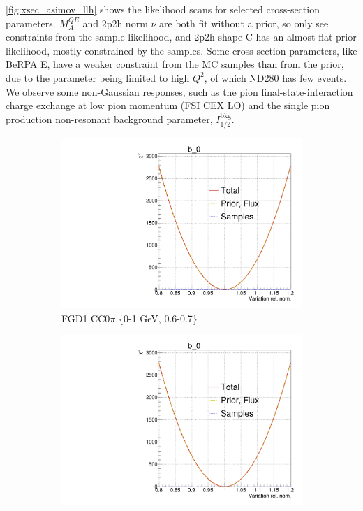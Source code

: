 \autoref{fig:xsec_asimov_llh} shows the likelihood scans for selected cross-section parameters. $M_A^{QE}$ and 2p2h norm $\nu$ are both fit without a prior, so only see constraints from the sample likelihood, and 2p2h shape C has an almost flat prior likelihood, mostly constrained by the samples. Some cross-section parameters, like BeRPA E, have a weaker constraint from the MC samples than from the prior, due to the parameter being limited to high $Q^2$, of which ND280 has few events. We observe some non-Gaussian responses, such as the pion final-state-interaction charge exchange at low pion momentum (FSI CEX LO) and the single pion production non-resonant background parameter, $I_{1/2}^\text{bkg}$.
\begin{figure}[!h]
	\centering
	\begin{subfigure}[t]{0.32\textwidth}
		\includegraphics[width=\textwidth, trim={0mm 0mm 0mm 11mm}, clip,page=132]{figures/mach3/Asimov/Full_LLHscan_18July_BeRPA_U_ND280logL_scan}
		\caption{FGD1 CC0$\pi$ 	\{0-1 GeV, 0.6-0.7\}}
	\end{subfigure}
	\begin{subfigure}[t]{0.32\textwidth}
		\includegraphics[width=\textwidth, trim={0mm 0mm 0mm 11mm}, clip,page=239]{figures/mach3/Asimov/Full_LLHscan_18July_BeRPA_U_ND280logL_scan}

\end{subfigure}
\end{figure}
